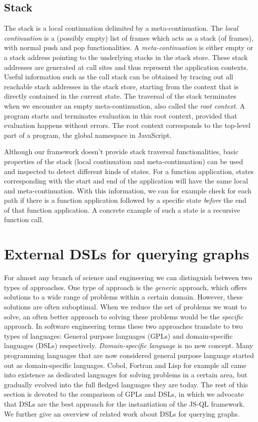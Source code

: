 \subsection*{Stack}

The stack is a local continuation delimited by a meta-continuation. The \textit{local continuation} is a (possibly empty) list of frames which acts as a stack (of frames), with normal push and pop functionalities. A \textit{meta-continuation} is either empty or a stack address pointing to the underlying stacks in the stack store. These stack addresses are generated at call sites and thus represent the application contexts. Useful information such as the call stack can be obtained by tracing out all reachable stack addresses in the stack store, starting from the context that is directly contained in the current state. The traversal of the stack terminates when we encounter an empty meta-continuation, also called the \textit{root context}. A program starts and terminates evaluation in this root context, provided that evaluation happens without errors. The root context corresponds to the top-level part of a program, the global namespace in JavaScript.

Although our framework doesn't provide stack traversal functionalities, basic properties of the stack (local continuation and meta-continuation) can be used and inspected to detect different kinds of states. For a function application, states corresponding with the start and end of the application will have the same local and meta-continuation. With this information, we can for example check for each path if there is a function application followed by a specific state \textit{before} the end of that function application. A concrete example of such a state is a recursive function call.

\section{External DSLs for querying graphs}

For almost any branch of science and engineering we can distinguish between two types of approaches. One type of approach is the \textit{generic} approach, which offers solutions to a wide range of problems within a certain domain. However, these solutions are often suboptimal. When we reduce the set of problems we want to solve, an often better approach to solving these problems would be the \textit{specific} approach.
In software engineering terms these two approaches translate to two types of languages: General purpose languages (GPLs) and domain-specific languages (DSLs) respectively. 
\textit{Domain-specific language} is no new concept. Many programming languages that are now considered general purpose language started out as domain-specific languages. Cobol, Fortran and Lisp for example all came into existence as dedicated languages for solving problems in a certain area\cite{vanDeursen:2000}, but gradually evolved into the full fledged languages they are today. The rest of this section is devoted to the comparison of GPLs and DSLs, in which we advocate that DSLs are the best approach for the instantiation of the JS-QL framework. We further give an overview of related work about DSLs for querying graphs.


